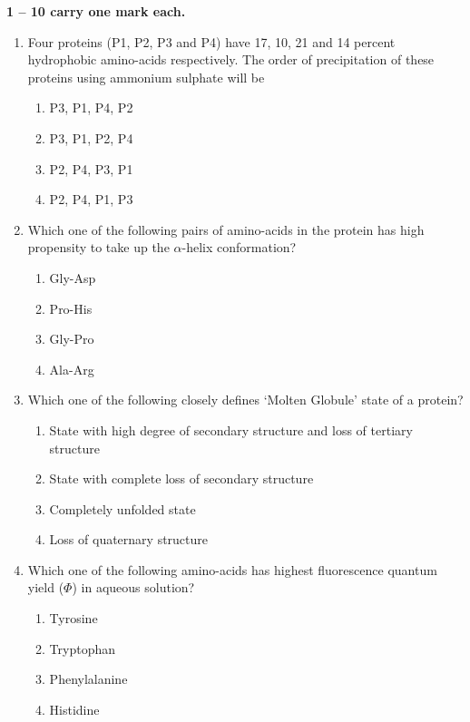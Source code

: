 \documentclass[journal,12pt,onecolumn]{IEEEtran}
\begin{document}
\noindent \textbf{ 1 --  10 carry one mark each.}
\begin{enumerate}[label=\arabic*.]
\item Four proteins (P1, P2, P3 and P4) have 17, 10, 21 and 14 percent hydrophobic amino-acids respectively. The order of precipitation of these proteins using ammonium sulphate will be
\begin{multicols}{4}
\begin{enumerate}[label=(\Alph*)]
\item P3, P1, P4, P2
\item P3, P1, P2, P4
\item P2, P4, P3, P1
\item P2, P4, P1, P3
\end{enumerate}
\end{multicols}

\item Which one of the following pairs of amino-acids in the protein has high propensity to take up the $\alpha$-helix conformation?
\begin{multicols}{4}
\begin{enumerate}[label=(\Alph*)]
\item Gly-Asp
\item Pro-His
\item Gly-Pro
\item Ala-Arg
\end{enumerate}
\end{multicols}

\item Which one of the following closely defines `Molten Globule’ state of a protein?
\begin{enumerate}[label=(\Alph*)]
\item State with high degree of secondary structure and loss of tertiary structure
\item State with complete loss of secondary structure
\item Completely unfolded state
\item Loss of quaternary structure
\end{enumerate}

\item Which one of the following amino-acids has highest fluorescence quantum yield ($\Phi$) in aqueous solution?
\begin{multicols}{4}
\begin{enumerate}[label=(\Alph*)]
\item Tyrosine 
\item Tryptophan 
\item Phenylalanine 
\item Histidine
\end{enumerate}
\end{multicols}


\end{enumerate}
\end{document}
